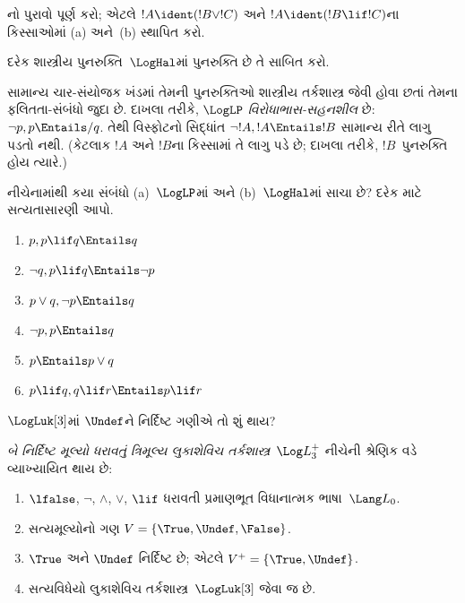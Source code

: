 \documentclass[../../../include/open-logic-section]{subfiles}
\begin{document}
\begin{prob}
  નો પુરાવો પૂર્ણ કરો; એટલે
  $!A \ident (!B \lor !C)$ અને $!A \ident (!B \lif !C)$ના
  કિસ્સાઓમાં (a) અને~(b) સ્થાપિત કરો.
\end{prob}

\begin{prob}
દરેક શાસ્ત્રીય પુનરુક્તિ~$\LogHal$માં પુનરુક્તિ છે તે સાબિત કરો.
\end{prob}

સામાન્ય ચાર-સંયોજક ખંડમાં તેમની પુનરુક્તિઓ શાસ્ત્રીય તર્કશાસ્ત્ર
જેવી હોવા છતાં તેમના ફલિતતા-સંબંધો જુદા છે. દાખલા તરીકે,
$\LogLP$ \emph{વિરોધાભાસ-સહનશીલ} છે: $\lnot p, p \Entails/ q$.
તેથી વિસ્ફોટનો સિદ્ધાંત $\lnot !A, !A \Entails !B$ સામાન્ય રીતે
લાગુ પડતો નથી. (કેટલાક $!A$ અને $!B$ના કિસ્સામાં તે લાગુ પડે છે;
દાખલા તરીકે, $!B$~પુનરુક્તિ હોય ત્યારે.)

\begin{prob}
  નીચેનામાંથી કયા સંબંધો (a)~$\LogLP$માં અને (b)~$\LogHal$માં
  સાચા છે? દરેક માટે સત્યતાસારણી આપો.
  \begin{enumerate}
    \item $p, p \lif q \Entails q$
    \item $\lnot q, p \lif q \Entails \lnot p$
    \item $p \lor q, \lnot p \Entails q$
    \item $\lnot p, p \Entails q$
    \item $p \Entails p \lor q$
    \item $p \lif q, q\lif r \Entails p \lif r$
  \end{enumerate}
\end{prob}

$\LogLuk[3]$માં $\Undef$ને નિર્દિષ્ટ ગણીએ તો શું થાય?

\begin{defn}
\emph{બે નિર્દિષ્ટ મૂલ્યો ધરાવતું ત્રિમૂલ્ય લુકાશેવિચ
તર્કશાસ્ત્ર}~$\Log L_3^{+}$ નીચેની શ્રેણિક વડે વ્યાખ્યાયિત થાય છે:
  \begin{enumerate}
    \item $\lfalse$, $\lnot$, $\land$, $\lor$, $\lif$
    ધરાવતી પ્રમાણભૂત વિધાનાત્મક ભાષા~$\Lang L_0$.
    \item સત્યમૂલ્યોનો ગણ $V = \{\True, \Undef, \False\}$.
    \item $\True$ અને $\Undef$ નિર્દિષ્ટ છે; એટલે $V^+ = \{\True, \Undef\}$.
    \item સત્યવિધેયો લુકાશેવિચ તર્કશાસ્ત્ર~$\LogLuk[3]$ જેવા જ છે.
  \end{enumerate}
\end{defn}
\end{document}
